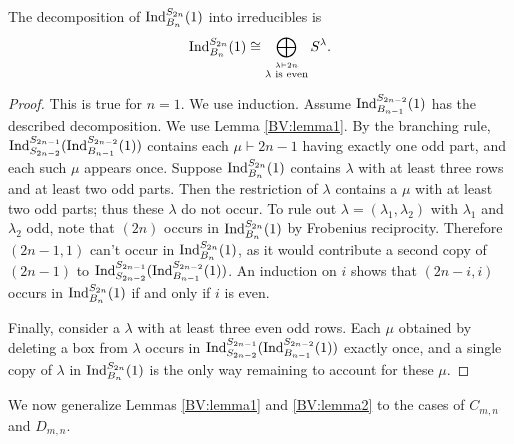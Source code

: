 \begin{theorem}\label{BV:theorem1}
The decomposition of $\textup{Ind}_{B_n}^{S_{2n}}(1)$ into irreducibles is 
$$\textup{Ind}_{B_n}^{S_{2n}}(1) \cong \bigoplus_{\stackrel{\lambda \vdash 2n}{\lambda  \textup{ is even}}} S^\lambda.$$
\end{theorem}
\begin{proof}
This is true for $n=1$. We use induction. Assume $\textup{Ind}_{B_{n-1}}^{S_{2n-2}}(1)$ has the described decomposition. We use Lemma \ref{BV:lemma1}. By the branching rule, $\textup{Ind}^{S_{2n-1}}_{S_{2n-2}}(\textup{Ind}_{B_{n-1}}^{S_{2n-2}}(1))$ contains each $\mu \vdash 2n-1$ having exactly one odd part, and each such $\mu$ appears once. Suppose $\textup{Ind}_{B_n}^{S_{2n}}(1)$ contains $\lambda$ with at least three rows and at least two odd parts. Then the restriction of $\lambda$ contains a $\mu$ with at least two odd parts; thus these $\lambda$ do not occur. To rule out $\lambda=(\lambda_1,\lambda_2)$ with $\lambda_1$ and $\lambda_2$ odd, note that $(2n)$ occurs in $\textup{Ind}_{B_n}^{S_{2n}}(1)$ by Frobenius reciprocity. Therefore $(2n-1,1)$ can't occur in $\textup{Ind}_{B_n}^{S_{2n}}(1)$, as it would contribute a second copy of $(2n-1)$ to $\textup{Ind}^{S_{2n-1}}_{S_{2n-2}}(\textup{Ind}_{B_{n-1}}^{S_{2n-2}}(1))$. An induction on $i$ shows that $(2n-i,i)$ occurs in $\textup{Ind}_{B_n}^{S_{2n}}(1)$ if and only if $i$ is even.

Finally, consider a $\lambda$ with at least three even odd rows. Each $\mu$ obtained by deleting a box from $\lambda$ occurs in $\textup{Ind}^{S_{2n-1}}_{S_{2n-2}}(\textup{Ind}_{B_{n-1}}^{S_{2n-2}}(1))$ exactly once, and a single copy of $\lambda$ in $\textup{Ind}_{B_n}^{S_{2n}}(1)$ is the only way remaining to account for these $\mu$.
\end{proof}

We now generalize Lemmas \ref{BV:lemma1} and \ref{BV:lemma2} to the cases of $C_{m,n}$ and $D_{m,n}$.


